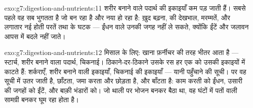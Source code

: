 \begin{solution}{exo:g7:digestion-and-nutrients:11}
शरीर बनाने वाले पदार्थ की इकाइयाँ कम पड़ जाती हैं। सबसे पहले वह सब
भुगतता है जो बन रहा है और नया हो रहा है: ख़ुद बढ़ना,  की
देखभाल, मरम्मतें, और लगातार नई होती परतें तथा  के घटक --- ईंधन
वाले  उनकी जगह नहीं ले सकते, क्योंकि ईंटें और जलावन आपस में
बदले नहीं जाते।
\end{solution}

\begin{solution}{exo:g7:digestion-and-nutrients:12}
मिसाल के लिए: खाना फ़र्नीचर की तरह भीतर आता है --- स्टार्च, शरीर बनाने
वाला पदार्थ, चिकनाई। ठिकाने-दर-ठिकाने उसके रस हर एक को उसकी इकाइयों में
काटते हैं: शर्कराएँ, शरीर बनाने वाली इकाइयाँ, चिकनाई की इकाइयाँ ---
यानी पहुँचाने की सूची।  पर वह सूची  में उतर जाती है, 
छाँटता, जमा करता और छोड़ता है, और  बाँटता है: काम करती  को
ईंधन, उसारी की जगहों को ईंटें, और बाक़ी भंडारों को। जो थाली पर भोजन बनकर
बैठा था, वह घंटों में पतों वाली सामग्री बनकर घूम रहा होता है।
\end{solution}

